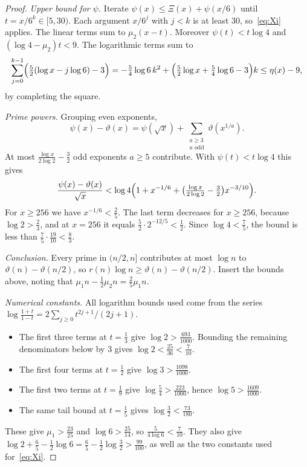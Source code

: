 \begin{proof}
\emph{Upper bound for $\psi$.} Iterate $\psi(x)\le\Xi(x)+\psi(x/6)$ until $t=x/6^k\in[5,30)$. Each argument $x/6^j$ with $j<k$ is at least $30$, so~\eqref{eq:Xi} applies. The linear terms sum to $\mu_2(x-t)$. Moreover $\psi(t)<t\log4$ and $(\log4-\mu_2)t<9$. The logarithmic terms sum to
\[
 \sum_{j=0}^{k-1}\Bigl(\tfrac52(\log x-j\log6)-3\Bigr)
 =-\tfrac54\log6\,k^2+\Bigl(\tfrac52\log x+\tfrac54\log6-3\Bigr)k\le\eta(x)-9,
\]
by completing the square.

\emph{Prime powers.} Grouping even exponents,
\[
 \psi(x)-\vartheta(x)=\psi(\sqrt x)+\sum_{\substack{a\ge3\\ a\text{ odd}}}\vartheta(x^{1/a}).
\]
At most $\frac{\log x}{2\log2}-\frac32$ odd exponents $a\ge5$ contribute. With $\psi(t)<t\log4$ this gives
\[
 \frac{\psi(x)-\vartheta(x)}{\sqrt x}<\log4\Bigl(1+x^{-1/6}+\bigl(\tfrac{\log x}{2\log2}-\tfrac32\bigr)x^{-3/10}\Bigr).
\]
For $x\ge256$ we have $x^{-1/6}<\frac25$. The last term decreases for $x\ge256$, because $\log2>\frac23$, and at $x=256$ it equals $\frac52\cdot2^{-12/5}<\frac12$. Since $\log4<\frac75$, the bound is less than $\frac75\cdot\frac{19}{10}<\frac83$.

\emph{Conclusion.} Every prime in $(n/2,n]$ contributes at most $\log n$ to $\vartheta(n)-\vartheta(n/2)$, so $r(n)\log n\ge\vartheta(n)-\vartheta(n/2)$. Insert the bounds above, noting that $\mu_1n-\frac12\mu_2n=\frac25\mu_1n$.

\emph{Numerical constants.} All logarithm bounds used come from the series $\log\frac{1+t}{1-t}=2\sum_{j\ge0}t^{2j+1}/(2j+1)$.
\begin{itemize}
\item The first three terms at $t=\frac13$ give $\log2>\frac{693}{1000}$. Bounding the remaining denominators below by $3$ gives $\log2<\frac{25}{36}<\frac7{10}$.
\item The first four terms at $t=\frac12$ give $\log3>\frac{1098}{1000}$.
\item The first two terms at $t=\frac19$ give $\log\frac54>\frac{223}{1000}$, hence $\log5>\frac{1609}{1000}$.
\item The same tail bound at $t=\frac15$ gives $\log\frac32<\frac{73}{180}$.
\end{itemize}
These give $\mu_1>\frac{23}{25}$ and $\log6>\frac{25}{14}$, so $\frac{5}{4\log6}<\frac7{10}$. They also give $\log2+\frac65-\frac12\log6=\frac65-\frac12\log\frac32>\frac{99}{100}$, as well as the two constants used for~\eqref{eq:Xi}.
\end{proof}

